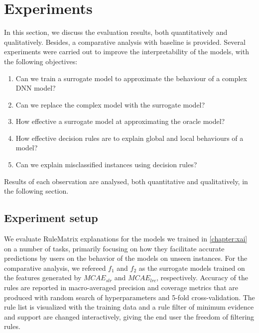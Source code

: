 \section{Experiments} \label{chapter_7:results}
In this section, we discuss the evaluation results, both quantitatively and qualitatively. Besides, a comparative analysis with baseline is provided. Several experiments were carried out to improve the interpretability of the models, with the following objectives: 

\begin{enumerate}[noitemsep]
    \item Can we train a surrogate model to approximate the behaviour of a complex DNN model? 
    \item Can we replace the complex model with the surrogate model? 
    \item How effective a surrogate model at approximating the oracle model?  
    \item How effective decision rules are to explain global and local behaviours of a model?   
    \item Can we explain misclassified instances using decision rules? 
\end{enumerate}

\hspace*{3.5mm} Results of each observation are analysed, both quantitative and qualitatively, in the following section. 

\subsection{Experiment setup}
We evaluate RuleMatrix explanations for the models we trained in \cref{chapter:xai} on a number of tasks, primarily focusing on how they facilitate accurate predictions by users on the behavior of the models on unseen instances. For the comparative analysis, we refereed $f_1$ and $f_2$ as the surrogate models trained on the features generated by $MCAE_{slr}$ and $MCAE_{lrc}$, respectively.  
Accuracy of the rules are reported in macro-averaged precision and coverage metrics that are produced with random search of hyperparameters and 5-fold cross-validation. The rule list is visualized with the training data and a rule filter of minimum evidence and support are changed interactively, giving the end user the freedom of filtering rules. 

